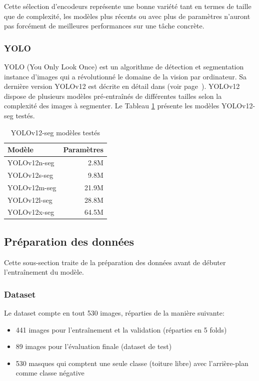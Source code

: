 Cette sélection d'encodeurs représente une bonne variété tant en termes de taille que de complexité, les modèles plus récents ou avec plus de paramètres n'auront pas forcément de meilleures performances sur une tâche concrète.

\subsubsection{YOLO}
YOLO (You Only Look Once) est un algorithme de détection et segmentation instance d'images qui a révolutionné le domaine de la vision par ordinateur. Sa dernière version YOLOv12 est décrite en détail dans \textit{} (voir page~\pageref{subsec:yolov12_attention_centric}). YOLOv12 dispose de plusieurs modèles pré-entraînés de différentes tailles selon la complexité des images à segmenter. Le Tableau \ref{tab:yolov12_modeles_testes} présente les modèles YOLOv12-seg testés.

\begin{table}[H]
    \centering
    \begin{tabular}{@{}lr@{}}
    \toprule
    \textbf{Modèle} & \textbf{Paramètres} \\
    \midrule
    YOLOv12n-seg & 2.8M \\
    YOLOv12s-seg & 9.8M \\
    YOLOv12m-seg & 21.9M \\
    YOLOv12l-seg & 28.8M \\
    YOLOv12x-seg & 64.5M \\
    \bottomrule
    \end{tabular}
    \caption{YOLOv12-seg modèles testés}
    \label{tab:yolov12_modeles_testes}
\end{table}

\subsection{Préparation des données}
Cette sous-section traite de la préparation des données avant de débuter l'entraînement du modèle.

\subsubsection{Dataset}
Le dataset compte en tout 530 images, réparties de la manière suivante:
\begin{itemize}
    \item 441 images pour l'entraînement et la validation (réparties en 5 folds)
    \item 89 images pour l'évaluation finale (dataset de test)
    \item 530 masques qui comptent une seule classe (toiture libre) avec l'arrière-plan comme classe négative
\end{itemize}

